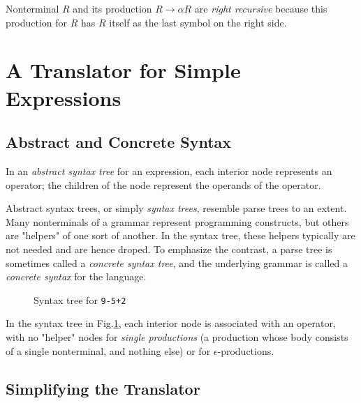 \documentclass[12pt,a4paper,twoside,openany]{book}
\begin{document}
Nonterminal $R$ and its production $R\to\alpha R$ are \textit{right recursive} because this production for $R$ has $R$ itself as the last symbol on the right side.

\section{A Translator for Simple Expressions}

\subsection{Abstract and Concrete Syntax}

In an \textit{abstract syntax tree} for an expression, each interior node represents an operator; the children of the node represent the operands of the operator.

Abstract syntax trees, or simply \textit{syntax trees}, resemble parse trees to an extent. Many nonterminals of a grammar represent programming constructs, but others are "helpers" of one sort of another. In the syntax tree, these helpers typically are not needed and are hence droped. To emphasize the contrast, a parse tree is sometimes called a \textit{concrete syntax tree}, and the underlying grammar is called a \textit{concrete syntax} for the language.

\begin{figure}[htbp]
    \centering
    \caption{Syntax tree for \texttt{9-5+2}}
    \label{Figure:2.22}
\end{figure}

In the syntax tree in Fig.\;\ref{Figure:2.22}, each interior node is associated with an operator, with no "helper" nodes for \textit{single productions} (a production whose body consists of a single nonterminal, and nothing else) or for $\epsilon$-productions.

\subsection{Simplifying the Translator}
\end{document}
